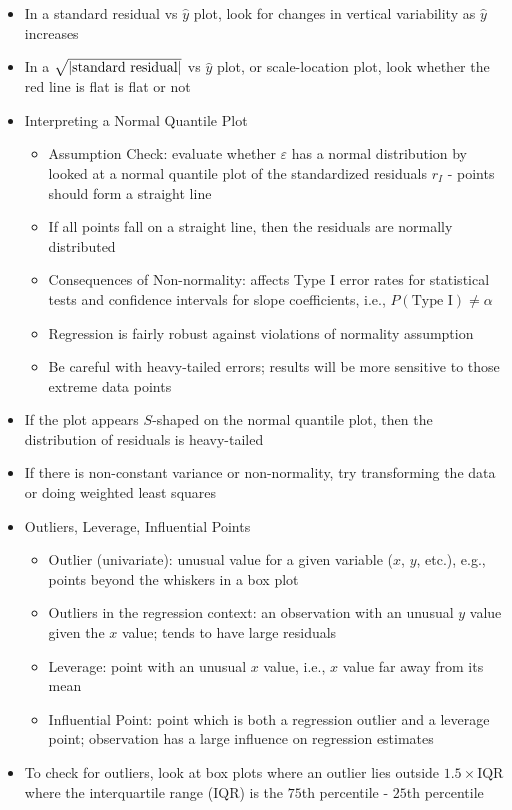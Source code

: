 \documentclass[12pt]{article}
\begin{document}
\begin{itemize}
\item  In a standard residual vs $\hat{y}$ plot, look for changes in vertical variability as $\hat{y}$ increases 
\item In a $\sqrt{\abs{\text{standard residual}}}$ vs $\hat{y}$ plot, or scale-location plot, look whether the red line is flat is flat or not 
\item Interpreting a Normal Quantile Plot \begin{itemize} 
\item Assumption Check: evaluate whether $\varepsilon$ has a normal distribution by looked at a normal quantile plot of the standardized residuals $r_I$ - points should form a straight line 
\item If all points fall on a straight line, then the residuals are normally distributed 
\item Consequences of Non-normality: affects Type I error rates for statistical tests and confidence intervals for slope coefficients, i.e., $P(\text{Type I}) \neq \alpha$
\item Regression is fairly robust against violations of normality assumption 
\item Be careful with heavy-tailed errors; results will be more sensitive to those extreme data points
\end{itemize} 
\item If the plot appears $S$-shaped on the normal quantile plot, then the distribution of residuals is heavy-tailed 
\item If there is non-constant variance or non-normality, try transforming the data or doing weighted least squares 
\item Outliers, Leverage, Influential Points \begin{itemize} 
\item Outlier (univariate): unusual value for a given variable ($x$, $y$, etc.), e.g., points beyond the whiskers in a box plot
\item Outliers in the regression context: an observation with an unusual $y$ value given the $x$ value; tends to have large residuals 
\item Leverage: point with an unusual $x$ value, i.e., $x$ value far away from its mean
\item Influential Point: point which is both a regression outlier and a leverage point; observation has a large influence on regression estimates \end{itemize} 
\item To check for outliers, look at box plots where an outlier lies outside $1.5 \times \text{IQR}$ where the interquartile range (IQR) is the $75$th percentile - $25$th percentile 

\end{itemize}
\end{document}
